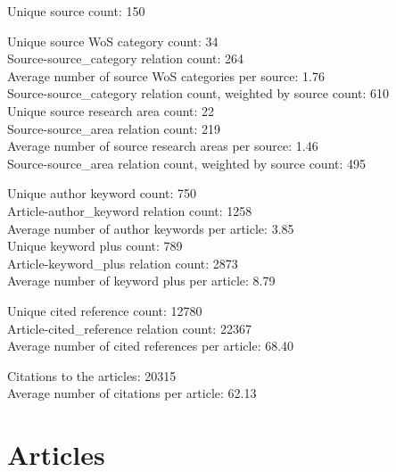 \documentclass[a4paper]{article}
\begin{document}
Unique source count: 150

Unique source WoS category count: 34\\
\hspace*{0.5cm} Source-source\_category relation count: 264\\
\hspace*{0.5cm} Average number of source WoS categories per source: 1.76\\
\hspace*{0.5cm} Source-source\_category relation count, weighted by source count: 610\\
Unique source research area count: 22\\
\hspace*{0.5cm} Source-source\_area relation count: 219\\
\hspace*{0.5cm} Average number of source research areas per source: 1.46\\
\hspace*{0.5cm} Source-source\_area relation count, weighted by source count: 495

Unique author keyword count: 750\\
\hspace*{0.5cm} Article-author\_keyword relation count: 1258\\
\hspace*{0.5cm} Average number of author keywords per article: 3.85\\
Unique keyword plus count: 789\\
\hspace*{0.5cm} Article-keyword\_plus relation count: 2873\\
\hspace*{0.5cm} Average number of keyword plus per article: 8.79

Unique cited reference count: 12780\\
\hspace*{0.5cm} Article-cited\_reference relation count: 22367\\
\hspace*{0.5cm} Average number of cited references per article: 68.40

Citations to the articles: 20315\\
\hspace*{0.5cm} Average number of citations per article: 62.13

\clearpage

\section{Articles}
\end{document}
